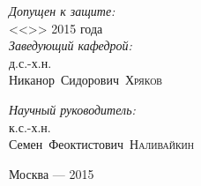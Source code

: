 \begin{titlepage}
\vspace{1cm}

\begin{minipage}[t]{0.4\textwidth}
\begin{flushleft} \large
\emph{Допущен к защите:}\\
<<\underline{\hspace{0.7cm}}>> \underline{\hspace{2cm}} 2015 года\\[1cm]
\emph{Заведующий кафедрой:}\\
д.с.-х.н.\\
Никанор\ Сидорович\ \textsc{Хряков}\\\vspace{0.5cm}
\underline{\hspace{4cm}}
\end{flushleft}
\end{minipage}
\hfill
\begin{minipage}[t]{0.4\textwidth}
\begin{flushright} \large
\emph{Научный руководитель:}\\
к.с.-х.н.\\
Семен\ Феоктистович\ \textsc{Наливайкин}\\\vspace{0.5cm}
\underline{\hspace{4cm}}
\end{flushright}
\end{minipage}


\vfill
{\large Москва --- 2015}

\end{titlepage}
